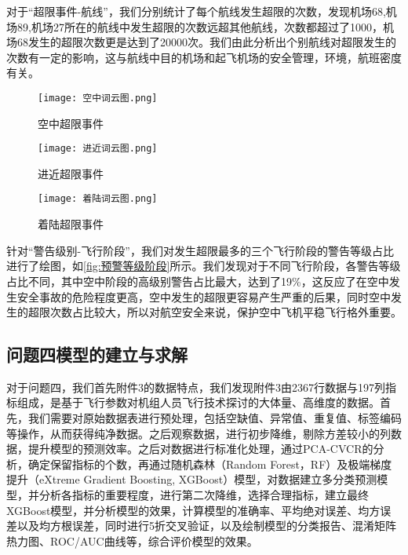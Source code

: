 \documentclass{MathorCupModeling}
\begin{document}
	对于“超限事件-航线”，我们分别统计了每个航线发生超限的次数，发现机场68,机场89,机场27所在的航线中发生超限的次数远超其他航线，次数都超过了1000，机场68发生的超限次数更是达到了20000次。我们由此分析出个别航线对超限发生的次数有一定的影响，这与航线中目的机场和起飞机场的安全管理，环境，航班密度有关。
	\begin{figure}[H]
		\centering
		\begin{minipage}{0.30\linewidth}
			\centering
			\texttt{[image: 空中词云图.png]}
			\caption{空中超限事件}
			\label{fig:空中词云图}
		\end{minipage}
		\begin{minipage}{0.30\linewidth}
			\centering
			\texttt{[image: 进近词云图.png]}
			\caption{进近超限事件}
			\label{fig:进近词云图}
		\end{minipage}
		\begin{minipage}{0.30\linewidth}
			\centering
			\texttt{[image: 着陆词云图.png]}
			\caption{着陆超限事件}
			\label{fig:着陆词云图}
		\end{minipage}
	\end{figure}
	针对“警告级别-飞行阶段”，我们对发生超限最多的三个飞行阶段的警告等级占比进行了绘图，如\textcolor{blue}{\cref{fig:预警等级阶段}}所示。我们发现对于不同飞行阶段，各警告等级占比不同，其中空中阶段的高级别警告占比最大，达到了19\%，这反应了在空中发生安全事故的危险程度更高，空中发生的超限更容易产生严重的后果，同时空中发生的超限次数占比较大，所以对航空安全来说，保护空中飞机平稳飞行格外重要。

	\subsection{问题四模型的建立与求解}
	对于问题四，我们首先附件3的数据特点，我们发现附件3由2367行数据与197列指标组成，是基于飞行参数对机组人员飞行技术探讨的大体量、高维度的数据。首先，我们需要对原始数据表进行预处理，包括空缺值、异常值、重复值、标签编码等操作，从而获得纯净数据。之后观察数据，进行初步降维，剔除方差较小的列数据，提升模型的预测效率。之后对数据进行标准化处理，通过PCA-CVCR的分析，确定保留指标的个数，再通过随机森林（Random Forest，RF）及极端梯度提升（eXtreme Gradient Boosting, XGBoost）模型，对数据建立多分类预测模型，并分析各指标的重要程度，进行第二次降维，选择合理指标，建立最终XGBoost模型，并分析模型的效果，计算模型的准确率、平均绝对误差、均方误差以及均方根误差，同时进行5折交叉验证，以及绘制模型的分类报告、混淆矩阵热力图、ROC/AUC曲线等，综合评价模型的效果。
\end{document}

